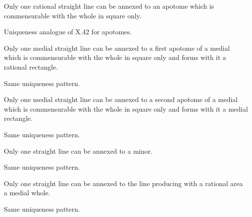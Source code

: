 \begin{claim}
\label{prop:X.79}
Only one rational straight line can be annexed to an apotome which
is commensurable with the whole in square only.
\end{claim}
\begin{evidence}[Proof of X.79]
\label{ev:X.79}
Uniqueness analogue of X.42 for apotomes.
\end{evidence}

\begin{claim}
\label{prop:X.80}
Only one medial straight line can be annexed to a first apotome of
a medial which is commensurable with the whole in square only and
forms with it a rational rectangle.
\end{claim}
\begin{evidence}[Proof of X.80]
\label{ev:X.80}
Same uniqueness pattern.
\end{evidence}

\begin{claim}
\label{prop:X.81}
Only one medial straight line can be annexed to a second apotome of
a medial which is commensurable with the whole in square only and
forms with it a medial rectangle.
\end{claim}
\begin{evidence}[Proof of X.81]
\label{ev:X.81}
Same uniqueness pattern.
\end{evidence}

\begin{claim}
\label{prop:X.82}
Only one straight line can be annexed to a minor.
\end{claim}
\begin{evidence}[Proof of X.82]
\label{ev:X.82}
Same uniqueness pattern.
\end{evidence}

\begin{claim}
\label{prop:X.83}
Only one straight line can be annexed to the line producing with a
rational area a medial whole.
\end{claim}
\begin{evidence}[Proof of X.83]
\label{ev:X.83}
Same uniqueness pattern.
\end{evidence}

